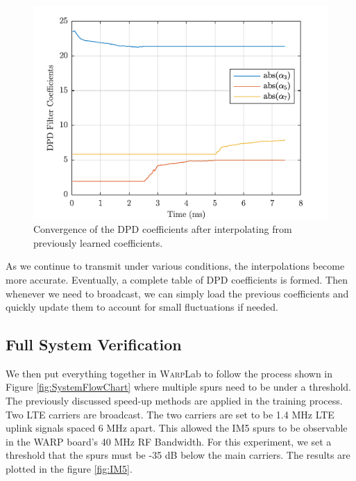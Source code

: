 \begin{figure}[t!] 
\centering
\includegraphics[]{Figures/Interpolate} 
\caption{Convergence of the DPD coefficients after interpolating from previously learned coefficients.}
\label{fig:Interpolate}
\end{figure}

 As we continue to transmit under various conditions, the interpolations become more accurate. Eventually, a complete table of DPD coefficients is formed. Then whenever we need to broadcast, we can simply load the previous coefficients and quickly update them to account for small fluctuations if needed. 
 
 \subsection{Full System Verification}
 We then put everything together in \textsc{Warp}Lab to follow the process shown in Figure \ref{fig:SystemFlowChart} where multiple spurs need to be under a threshold. The previously discussed speed-up methods are applied in the training process. Two LTE carriers are broadcast. The two carriers are set to be 1.4 MHz LTE uplink signals spaced 6 MHz apart. This allowed the IM5 spurs to be observable in the WARP board's 40 MHz RF Bandwidth. For this experiment, we set a threshold that the spurs must be -35 dB below the main carriers. The results are plotted in the figure \ref{fig:IM5}.
 
